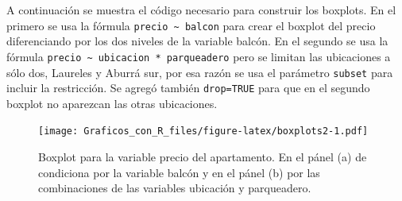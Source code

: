 \documentclass[10pt,]{krantz}
\makeatletter
\newenvironment{Shaded}{\begin{snugshade}}{\end{snugshade}}
\newcommand{\KeywordTok}[1]{\textcolor[rgb]{0.13,0.29,0.53}{\textbf{#1}}}
\newcommand{\DataTypeTok}[1]{\textcolor[rgb]{0.13,0.29,0.53}{#1}}
\newcommand{\DecValTok}[1]{\textcolor[rgb]{0.00,0.00,0.81}{#1}}
\newcommand{\StringTok}[1]{\textcolor[rgb]{0.31,0.60,0.02}{#1}}
\newcommand{\OtherTok}[1]{\textcolor[rgb]{0.56,0.35,0.01}{#1}}
\newcommand{\OperatorTok}[1]{\textcolor[rgb]{0.81,0.36,0.00}{\textbf{#1}}}
\newcommand{\NormalTok}[1]{#1}
\newenvironment{kframe}{%
\medskip{}
\setlength{\fboxsep}{.8em}
 \def\at@end@of@kframe{}%
 \ifinner\ifhmode%
  \def\at@end@of@kframe{\end{minipage}}%
  \begin{minipage}{\columnwidth}%
 \fi\fi%
 \def\FrameCommand##1{\hskip\@totalleftmargin \hskip-\fboxsep
 \colorbox{shadecolor}{##1}\hskip-\fboxsep
     \hskip-\linewidth \hskip-\@totalleftmargin \hskip\columnwidth}%
 \MakeFramed {\advance\hsize-\width
   \@totalleftmargin\z@ \linewidth\hsize
   \@setminipage}}%
 {\par\unskip\endMakeFramed%
 \at@end@of@kframe}
\renewenvironment{Shaded}{\begin{kframe}}{\end{kframe}}
\makeatother
\begin{document}
A continuación se muestra el código necesario para construir los
boxplots. En el primero se usa la fórmula
\texttt{precio\ \textasciitilde{}\ balcon} para crear el boxplot del
precio diferenciando por los dos niveles de la variable balcón. En el
segundo se usa la fórmula
\texttt{precio\ \textasciitilde{}\ ubicacion\ *\ parqueadero} pero se
limitan las ubicaciones a sólo dos, Laureles y Aburrá sur, por esa razón
se usa el parámetro \texttt{subset} para incluir la restricción. Se
agregó también \texttt{drop=TRUE} para que en el segundo boxplot no
aparezcan las otras ubicaciones.

\begin{Shaded}
\end{Shaded}

\begin{figure}
\centering
\texttt{[image: Graficos\_con\_R\_files/figure-latex/boxplots2-1.pdf]}
\caption{\label{fig:boxplots2}Boxplot para la variable precio del
apartamento. En el pánel (a) de condiciona por la variable balcón y en
el pánel (b) por las combinaciones de las variables ubicación y
parqueadero.}
\end{figure}
\end{document}
